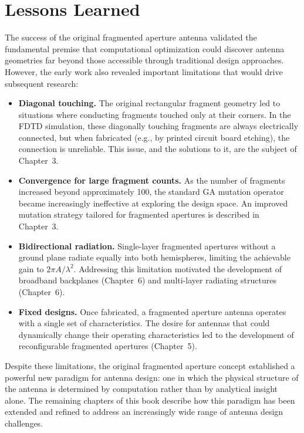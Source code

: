 \section{Lessons Learned}

The success of the original fragmented aperture antenna validated the fundamental premise that computational optimization could discover antenna geometries far beyond those accessible through traditional design approaches.  However, the early work also revealed important limitations that would drive subsequent research:

\begin{itemize}

\item \textbf{Diagonal touching.}  The original rectangular fragment geometry led to situations where conducting fragments touched only at their corners.  In the FDTD simulation, these diagonally touching fragments are always electrically connected, but when fabricated (e.g., by printed circuit board etching), the connection is unreliable.  This issue, and the solutions to it, are the subject of Chapter~3.

\item \textbf{Convergence for large fragment counts.}  As the number of fragments increased beyond approximately 100, the standard GA mutation operator became increasingly ineffective at exploring the design space.  An improved mutation strategy tailored for fragmented apertures is described in Chapter~3.

\item \textbf{Bidirectional radiation.}  Single-layer fragmented apertures without a ground plane radiate equally into both hemispheres, limiting the achievable gain to $2\pi A/\lambda^2$.  Addressing this limitation motivated the development of broadband backplanes (Chapter~6) and multi-layer radiating structures (Chapter~6).

\item \textbf{Fixed designs.}  Once fabricated, a fragmented aperture antenna operates with a single set of characteristics.  The desire for antennas that could dynamically change their operating characteristics led to the development of reconfigurable fragmented apertures (Chapter~5).

\end{itemize}

Despite these limitations, the original fragmented aperture concept established a powerful new paradigm for antenna design: one in which the physical structure of the antenna is determined by computation rather than by analytical insight alone.  The remaining chapters of this book describe how this paradigm has been extended and refined to address an increasingly wide range of antenna design challenges.


\FloatBarrier





